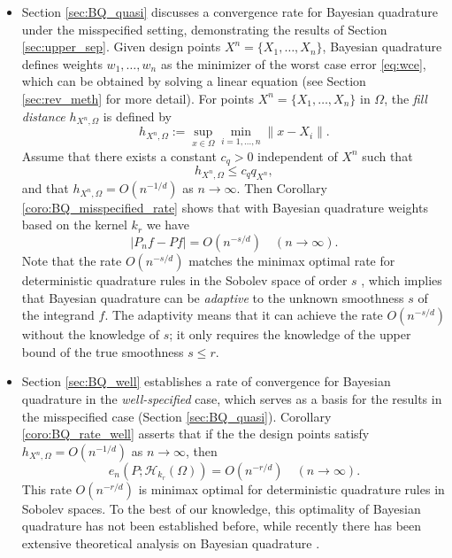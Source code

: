 \documentclass[11pt]{article}
\theoremstyle{remark}
\theoremstyle{example}
\theoremstyle{remark}
\renewcommand{\H}{{\mathcal{H}}}
\newcommand{\citep}{\cite}
\begin{document}
\begin{itemize}
\item
Section \ref{sec:BQ_quasi} discusses a convergence rate for Bayesian quadrature under the misspecified setting, demonstrating the results of Section \ref{sec:upper_sep}.  Given design points $X^n=\{X_1,\dots,X_n\}$, Bayesian quadrature defines weights $w_1,\ldots,w_n$ as the minimizer of the worst case error \eqref{eq:wce}, which can be obtained by solving a linear equation (see Section \ref{sec:rev_meth} for more detail).  For points $X^n=\{X_1,\dots,X_n\}$ in $\Omega$, the {\em fill distance} $h_{X^n,\Omega}$ is defined by  
\begin{equation}\label{eq:fill_dist}
h_{X^n, \Omega} := \sup_{x \in \Omega} \min_{i=1,\dots,n} \| x - X_i \|.
\end{equation}
Assume that there exists a constant $c_q > 0$ independent of $X^n$ such that
\begin{equation} \label{eq:quasi_uni_intro247}
h_{X^n,\Omega} \leq c_q q_{X^n},
\end{equation}
and that $h_{X^n,\Omega} = O(n^{- 1/d})$ as $n \to \infty$.
Then Corollary \ref{coro:BQ_misspecified_rate} shows that with Bayesian quadrature weights based on the kernel $k_r$ we have 
\begin{equation*} 
\left| P_n f - Pf \right| = O(n^{ - s/d }) \quad (n \to \infty). 
\end{equation*}
Note that the rate $O(n^{ - s/d })$ matches the minimax optimal rate for deterministic quadrature rules in the Sobolev space of order $s$  \citep{Nov88}, which implies that Bayesian quadrature can be {\em adaptive} to the unknown smoothness $s$ of the integrand $f$. The adaptivity means that it can achieve the rate $O(n^{-s/d})$ without the knowledge of $s$; it only requires the knowledge of the upper bound of the true smoothness $s \leq r$.\vspace{-1mm}

\item
Section \ref{sec:BQ_well} establishes a rate of convergence for Bayesian quadrature in the {\em well-specified} case, which serves as a basis for the results in the misspecified case (Section \ref{sec:BQ_quasi}).  Corollary \ref{coro:BQ_rate_well} asserts that if the the design points satisfy $h_{X^n, \Omega} = O(n^{-1/d})$ as $n \to \infty$, then 
\[ e_n(P; \H_{k_r}(\Omega)) = O(n^{-r/d}) \quad (n\to \infty).\]
This rate $O(n^{-r/d})$ is minimax optimal for deterministic quadrature rules in Sobolev spaces.  
To the best of our knowledge, this optimality of Bayesian quadrature has not been established before, while recently there has been extensive theoretical analysis on Bayesian quadrature \citep{BriOatGirOsb15,BriOatGirOsbSej15,OatCocBriGir16,Bac17}.

\end{itemize}
\end{document}
